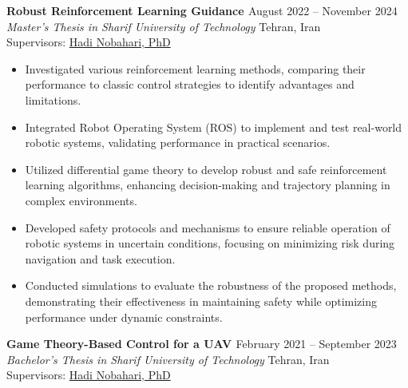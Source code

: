 \documentclass[12pt]{article}
\begin{document}
\noindent
{\bfseries  Robust Reinforcement Learning Guidance
\href{https://github.com/CNAVLAB}{\faGithub}
} \hfill August 2022 -- November 2024 \\ 
\noindent \textit{Master's Thesis in Sharif University of Technology} \hfill Tehran, Iran \\ 
\noindent Supervisors: 
\href{https://ae.sharif.edu/~portal/faculty/1091235256}{Hadi Nobahari, PhD}

\begin{itemize} \itemsep -4pt %
	\item Investigated various reinforcement learning methods, comparing their performance to classic control strategies to identify advantages and limitations.
	\item Integrated Robot Operating System (ROS) to implement and test real-world robotic systems, validating performance in practical scenarios.
	\item Utilized differential game theory to develop robust and safe reinforcement learning algorithms, enhancing decision-making and trajectory planning in complex environments.
	\item Developed safety protocols and mechanisms to ensure reliable operation of robotic systems in uncertain conditions, focusing on minimizing risk during navigation and task execution.
	\item Conducted simulations to evaluate the robustness of the proposed methods, demonstrating their effectiveness in maintaining safety while optimizing performance under dynamic constraints.
\end{itemize}



\noindent
{\bfseries Game Theory-Based Control for a UAV 
\href{https://github.com/alibaniasad1999/bachelor-thesis}{\faGithub}
\textcolor{red}{
\href{https://youtu.be/SXZACxGaE1A?si=61yCRB8jFIZlldFG}{\faYoutube}}
} \hfill February 2021 -- September 2023 \\ 
\noindent \textit{Bachelor's Thesis in Sharif University of Technology} \hfill Tehran, Iran \\ 
\noindent Supervisors: 
\href{https://ae.sharif.edu/~portal/faculty/1091235256}{Hadi Nobahari, PhD} 
\end{document}
